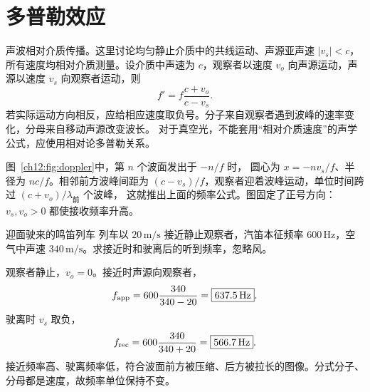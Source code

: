 \section{多普勒效应}

声波相对介质传播。这里讨论均匀静止介质中的共线运动、声源亚声速 $|v_s|<c$，所有速度均相对介质测量。设介质中声速为 $c$，观察者以速度 $v_o$ 向声源运动，声源以速度 $v_s$ 向观察者运动，则
\begin{equation}
 f'=f\frac{c+v_o}{c-v_s}.
\end{equation}
若实际运动方向相反，应给相应速度取负号。分子来自观察者遇到波峰的速率变化，分母来自移动声源改变波长。
对于真空光，不能套用“相对介质速度”的声学公式，应使用相对论多普勒关系。

\begin{center}
\label{ch12:fig:doppler}
\end{center}
图~\ref{ch12:fig:doppler}中，第 $n$ 个波面发出于 $-n/f$ 时，
圆心为 $x=-nv_s/f$、半径为 $nc/f$。相邻前方波峰间距为
$(c-v_s)/f$，观察者迎着波峰运动，单位时间跨过 $(c+v_o)/\lambda_{\text{前}}$ 个波峰，
这就推出上面的频率公式。图固定了正号方向：$v_s,v_o>0$ 都使接收频率升高。

\begin{origexamplebox}{迎面驶来的鸣笛列车}
\label{ch12:ex:04}
列车以 $20\,\mathrm{m/s}$ 接近静止观察者，汽笛本征频率 $600\,\mathrm{Hz}$，空气中声速
$340\,\mathrm{m/s}$。求接近时和驶离后的听到频率，忽略风。
\end{origexamplebox}
\begin{xesolution}
观察者静止，$v_o=0$。接近时声源向观察者，
\[
 f_{\rm app}=600\frac{340}{340-20}
 =\boxed{637.5\,\mathrm{Hz}}.
\]
驶离时 $v_s$ 取负，
\[
 f_{\rm rec}=600\frac{340}{340+20}
 =\boxed{566.7\,\mathrm{Hz}}.
\]
接近频率高、驶离频率低，符合波面前方被压缩、后方被拉长的图像。分式分子、分母都是速度，故频率单位保持不变。
\end{xesolution}

